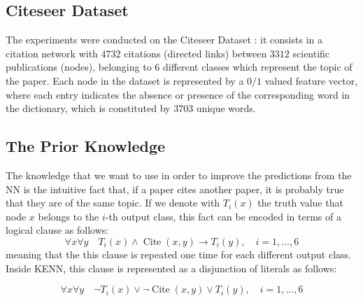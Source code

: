 \subsection{Citeseer Dataset}

The experiments were conducted on the Citeseer Dataset \cite{lu2003link}: it consists in a citation network with $4732$ citations (directed links) between $3312$ scientific publications (nodes), belonging to $6$ different classes which represent the topic of the paper. Each node in the dataset is represented by a $0/1$ valued feature vector, where each entry indicates the absence or presence of the corresponding word in the dictionary, which is constituted by $3703$ unique words.

\subsection{The Prior Knowledge}

The knowledge that we want to use in order to improve the predictions from the NN is the intuitive fact that, if a paper cites another paper, it is probably true that they are of the same topic. If we denote with $T_i(x)$ the truth value that node $x$ belongs to the $i$-th output class, this fact can be encoded in terms of a logical clause as follows:
$$\forall x \forall y \quad T_i(x) \wedge \operatorname{Cite}(x, y) \rightarrow T_i(y), \quad i=1,\dots,6$$
meaning that the this clause is repeated one time for each different output class. Inside KENN, this clause is represented as a disjunction of literals as follows:

$$\forall x \forall y \quad \neg T_i(x) \vee \neg \operatorname{Cite}(x,y) \vee T_i(y), \quad i=1,\dots,6 $$

